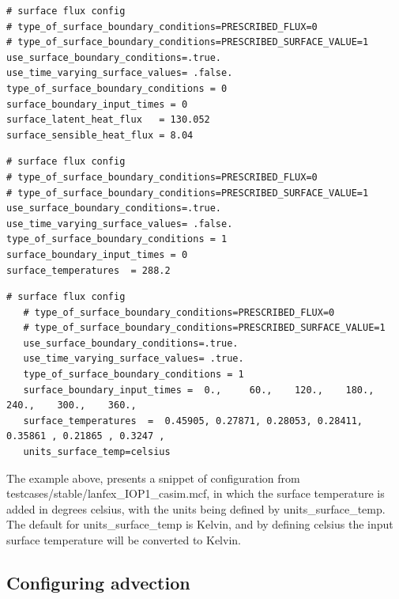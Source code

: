 \documentclass[a4paper,11pt]{article}
\begin{document}
\begin{lstlisting}[caption={Example configuration snippet for surface boundary
  condition from bomex.mcf, to show the config for using time independent surface fluxes}]
# surface flux config
# type_of_surface_boundary_conditions=PRESCRIBED_FLUX=0
# type_of_surface_boundary_conditions=PRESCRIBED_SURFACE_VALUE=1
use_surface_boundary_conditions=.true.
use_time_varying_surface_values= .false.
type_of_surface_boundary_conditions = 0
surface_boundary_input_times = 0
surface_latent_heat_flux   = 130.052
surface_sensible_heat_flux = 8.04
\end{lstlisting}

\begin{lstlisting}[caption={Example configuration snippet for surface boundary
  condition from fire\_sc.mcf, to show the config for time independent surface temperature}]
# surface flux config
# type_of_surface_boundary_conditions=PRESCRIBED_FLUX=0
# type_of_surface_boundary_conditions=PRESCRIBED_SURFACE_VALUE=1
use_surface_boundary_conditions=.true.
use_time_varying_surface_values= .false.
type_of_surface_boundary_conditions = 1
surface_boundary_input_times = 0
surface_temperatures  = 288.2
\end{lstlisting}

\begin{lstlisting}[caption={Example configuration snippet for surface boundary
  condition from lanfex\_IOP1\_casim.mcf, to show the config for time independent surface temperature}]
   # surface flux config
   # type_of_surface_boundary_conditions=PRESCRIBED_FLUX=0
   # type_of_surface_boundary_conditions=PRESCRIBED_SURFACE_VALUE=1
   use_surface_boundary_conditions=.true.
   use_time_varying_surface_values= .true.
   type_of_surface_boundary_conditions = 1
   surface_boundary_input_times =  0.,     60.,    120.,    180.,    240.,    300.,    360.,
   surface_temperatures  =  0.45905, 0.27871, 0.28053, 0.28411, 0.35861 , 0.21865 , 0.3247 ,
   units_surface_temp=celsius
\end{lstlisting}

The example above, presents a snippet of configuration from
testcases/stable/lanfex\_IOP1\_casim.mcf, in which the surface temperature is added
in degrees celsius, with the units being defined by units\_surface\_temp. The
default for units\_surface\_temp is Kelvin, and by defining celsius
the input surface temperature will be converted to Kelvin.

\subsection{Configuring advection}
\end{document}
